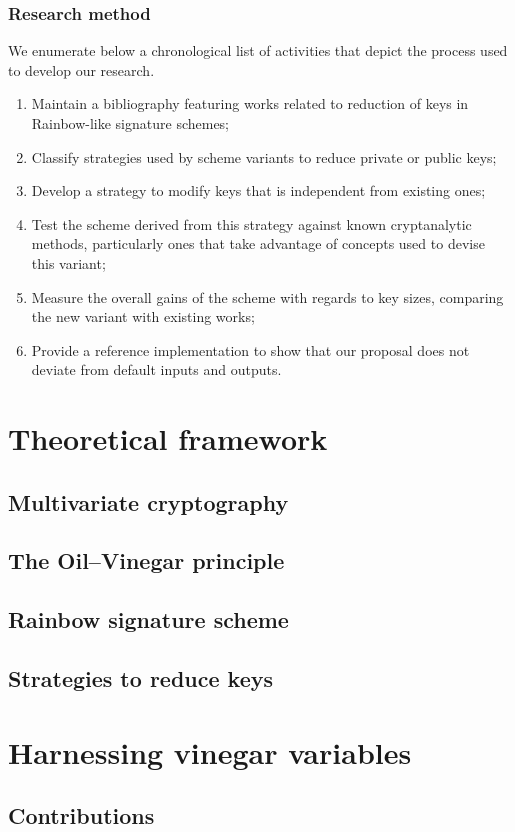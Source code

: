 \documentclass[openright, landscape]{report}
\begin{document}
\subsection{Research method}

We enumerate below a chronological list of activities that depict the process used to develop our research.

\begin{enumerate}[label=(\roman*), itemsep=1pt]
    \item Maintain a bibliography featuring works related to reduction of keys in Rainbow-like signature schemes;
    \item Classify strategies used by scheme variants to reduce private or public keys;
    \item Develop a strategy to modify keys that is independent from existing ones;
    \item Test the scheme derived from this strategy against known cryptanalytic methods, particularly ones that take advantage of concepts used to devise this variant;
    \item Measure the overall gains of the scheme with regards to key sizes, comparing the new variant with existing works;
    \item Provide a reference implementation to show that our proposal does not deviate from default inputs and outputs.
\end{enumerate}

\chapter{Theoretical framework}

\section{Multivariate cryptography}

\section{The Oil--Vinegar principle}

\section{Rainbow signature scheme}

\section{Strategies to reduce keys}

\chapter{Harnessing vinegar variables}

\section{Contributions}



\end{document}
